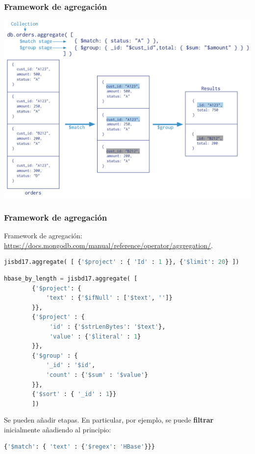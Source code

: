\documentclass[14pt]{beamer}
\begin{document}
\begin{frame}
\begin{itemize}
\begin{frame}
  \frametitle{Framework de agregación}
  \centering\includegraphics[height=.85\textheight]{img/mongo-aggregation}
\end{frame}

\begin{frame}
  \frametitle{Framework de agregación}
Framework de agregación:
\url{https://docs.mongodb.com/manual/reference/operator/aggregation/}.

\begin{lstlisting}[language=python]
jisbd17.aggregate( [ {'$project' : { 'Id' : 1 }}, {'$limit': 20} ])
\end{lstlisting}

\framebreak

\begin{lstlisting}[language=python]
hbase_by_length = jisbd17.aggregate( [
        {'$project': {
            'text' : {'$ifNull' : ['$text', '']}
        }},
        {'$project' : {
             'id' : {'$strLenBytes': '$text'},
             'value' : {'$literal' : 1}
        }},
        {'$group' : {
            '_id' : '$id',
            'count' : {'$sum' : '$value'}
        }},
        {'$sort' : { '_id' : 1}}
        ])
\end{lstlisting}

\framebreak

Se pueden añadir etapas. En particular, por ejemplo, se puede {\bf filtrar}
inicialmente añadiendo al principio:

\begin{lstlisting}[language=python]
{'$match': { 'text' : {'$regex': 'HBase'}}}
\end{lstlisting}


\end{frame}
\end{itemize}
\end{frame}
\end{document}
